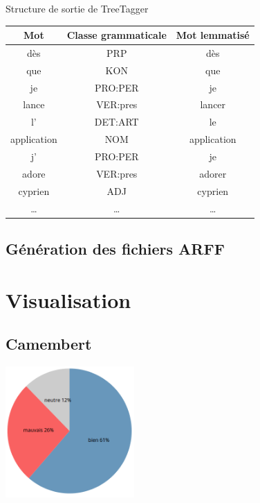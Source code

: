 \documentclass{beamer}
\begin{document}
\begin{frame}
\begin{exampleblock}{Structure de sortie de TreeTagger}
			\centering
			 \begin{tabular}{|c|c|c|}
					\hline
					Mot&Classe grammaticale&Mot lemmatisé\\
					\hline
					dès&PRP&dès\\
					que&KON&que\\
					je&PRO:PER&je\\
					lance&VER:pres&lancer\\
					l'&DET:ART&le\\
					application&NOM&application\\
					j'&PRO:PER&je\\
					adore&VER:pres&adorer\\
					cyprien&ADJ&cyprien\\
					\dots&\dots&\dots\\
					\hline
			 \end{tabular}
	\end{exampleblock}

\end{frame}

\subsection{Génération des fichiers ARFF}
\begin{frame}

\end{frame}

\section{Visualisation}
\subsection{Camembert}
\begin{frame}
	\includegraphics[height=5cm]{imgs/visu1.png}
\end{frame}
\end{document}
